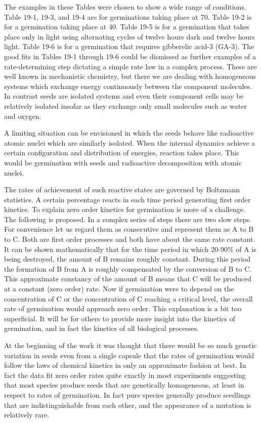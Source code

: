 The examples in these Tables were chosen to show a wide range of conditions.
Table 19-1, 19-3, and 19-4 are for germinations taking place at 70. Table 19-2 is for a
germination taking place at 40. Table 19-5 is for a germination that takes place only in
light using alternating cycles of twelve hours dark and twelve hours light. Table 19-6 is
for a germination that requires gibberelic acid-3 (GA-3).
The good fits in Tables 19-1 through 19-6 could be dismissed as further
examples of a rate-determining step dictating a simple rate law in a complex process.
These are well known in mechanistic chemistry, but there we are dealing with
homogeneous systems which exchange energy continuously between the component
molecules. In contrast seeds are isolated systems and even their component cells
may be relatively isolated insofar as they exchange only small molecules such as
water and oxygen.

A limiting situation can be envisioned in which the seeds behave like
radioactive atomic nuclei which are similarly isolated. When the internal dynamics
achieve a certain configuration and distribution of energies, reaction takes place. This
would be germination with seeds and radioactive decomposition with atomic nuclei.

The rates of achievement of such reactive states are governed by Boltzmann statistics.
A certain percentage reacts in each time period generating first order kinetics.
To explain zero order kinetics for germination is more of a challenge. The
following is proposed. In a complex series of steps there are two slow steps. For
convenience let us regard them as consecutive and represent them as A to B to C.
Both are first order processes and both have about the same rate constant. It can be
shown mathematically that for the time period in which 20-90\% of A is being
destroyed, the amount of B remains roughly constant. During this period the formation
of B from A is roughly compensated by the conversion of B to C. This approximate
constancy of the amount of B means that C will be produced at a constant (zero order)
rate. Now if germination were to depend on the concentration of C or the
concentration of C reaching a critical level, the overall rate of germination would
approach zero order. This explanation is a bit too superficial. It will be for others to
provide more insight into the kinetics of germination, and in fact the kinetics of all
biological processes.

At the beginning of the work it was thought that there would be so much genetic
variation in seeds even from a single capsule that the rates of germination would
follow the laws of chemical kinetics in only an approximate fashion at best. In fact the
data fit zero order rates quite exactly in most experiments suggesting that most species
produce seeds that are genetically homogeneous, at least in respect to rates of
germination. In fact pure species generally produce seedlings that are
indistinguishable from each other, and the appearance of a mutation is relatively rare.

